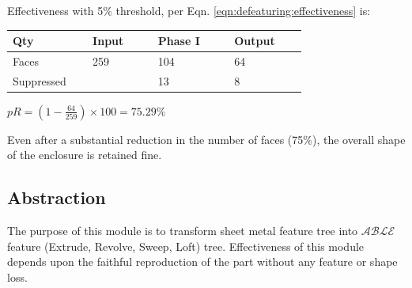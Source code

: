 Effectiveness with 5\% threshold, per Eqn. \ref{eqn:defeaturing:effectiveness} is:

\begin{minipage}[c]{0.6\linewidth}
\begin{tabular}[h]{@{} p{0.22\linewidth} p{0.18\linewidth} p{0.21\linewidth} p{0.2\linewidth} @{}}\toprule
\textbf{Qty} & \textbf{Input} & \textbf{Phase I} & \textbf{Output}\\  \midrule
Faces  & 259 & 104 & 64\\
Suppressed  &  &13 & 8\\
\bottomrule
\end{tabular}
\end{minipage}

\begin{minipage}[c]{0.38\linewidth}

$pR = (1 - \frac{64}{259}) \times 100 = 75.29\%$
\end{minipage}

Even after a substantial reduction in the number of faces (75\%), the overall shape of the enclosure is retained fine.

\subsection{Abstraction}

The purpose of this module is to transform sheet metal feature tree into  $\mathcal{ABLE}$ feature (Extrude, Revolve, Sweep, Loft) tree. Effectiveness of this module depends upon the faithful reproduction of the part without any feature or shape loss.

